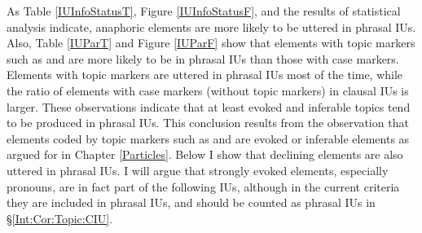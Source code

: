 As Table \ref{IUInfoStatusT}, Figure \ref{IUInfoStatusF}, and the results of statistical analysis indicate,
anaphoric elements are more likely to be uttered in phrasal IUs.
Also, Table \ref{IUParT} and Figure \ref{IUParF} show that
elements with topic markers such as  and  are more likely to be in phrasal IUs than those with case markers.
Elements with topic markers are uttered in phrasal IUs most of the time,
while the ratio of elements with case markers (without topic markers) in clausal IUs is larger.
These observations indicate that
at least evoked and inferable topics tend to be produced in phrasal IUs.
This conclusion results from the observation that
elements coded by topic markers such as  and 
are evoked or inferable elements as argued for in Chapter \ref{Particles}.
Below I show that declining elements are also uttered in phrasal IUs.
I will argue that strongly evoked elements, especially pronouns, are in fact part of the following IUs,
although in the current criteria they are included in phrasal IUs,
and should be counted as phrasal IUs in \S \ref{Int:Cor:Topic:CIU}.

